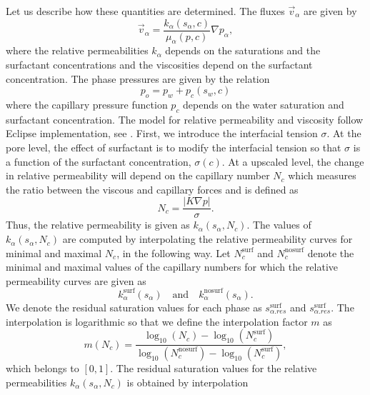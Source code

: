 \documentclass[11pt]{amsart}
\newcommand{\grad}{\nabla}
\newcommand{\abs}[1]{\left| #1\right|}
\newcommand{\surf}{\text{surf}}
\newcommand{\nosurf}{\text{nosurf}}
\begin{document}
Let us describe how these quantities are determined. The fluxes $\vec{v}_\alpha$ are given by
\begin{equation*}
  \vec{v}_\alpha = \frac{k_{\alpha}(s_\alpha, c)}{\mu_{\alpha}(p, c)}\grad p_\alpha,
\end{equation*}
where the relative permeabilities $k_{\alpha}$ depends on the saturations and the surfactant
concentrations and the viscosities depend on the surfactant concentration. The phase pressures are
given by the relation
\begin{equation}
  p_o = p_w + p_c(s_w, c) 
\end{equation}
where the capillary pressure function $p_c$ depends on the water saturation and surfactant
concentration. The model for relative permeability and viscosity follow Eclipse implementation, see
\cite{eclipse, jorgensen}. First, we introduce the interfacial tension $\sigma$. At the pore level,
the effect of surfactant is to modify the interfacial tension so that $\sigma$ is a function of the
surfactant concentration, $\sigma(c)$. At a upscaled level, the change in relative permeability will
depend on the capillary number $N_c$ which measures the ratio between the viscous and capillary
forces and is defined as
\begin{equation}
  \label{eq:defNc}
  N_c = \frac{\abs{K\grad p}}{\sigma}.
\end{equation}
Thus, the relative permeability is given as $k_{\alpha}(s_\alpha, N_c)$. The values of
$k_{\alpha}(s_\alpha, N_c)$ are computed by interpolating the relative permeability curves for
minimal and maximal $N_c$, in the following way. Let $N_c^{\surf}$ and $N_c^{\nosurf}$ denote the
minimal and maximal values of the capillary numbers for which the relative permeability curves are
given as
\begin{equation*}
  k_{\alpha}^{\surf}(s_\alpha)\quad\text{and}\quad k_{\alpha}^{\nosurf}(s_\alpha).
\end{equation*}
We denote the residual saturation values for each phase as $s_{\alpha. res}^{\surf}$ and
$s_{\alpha. res}^{\surf}$. The interpolation is logarithmic so that we define the interpolation factor
$m$ as
\begin{equation} 
  \label{eq:defm}
  m(N_c) = \frac{\log_{10}(N_c) - \log_{10}(N_c^{\surf})}{\log_{10}(N_c^{\nosurf}) - \log_{10}(N_c^{\surf})},
\end{equation}
which belongs to $[0,1]$. The residual saturation values for the relative permeabilities
$k_{\alpha}(s_\alpha, N_c)$ is obtained by interpolation
\end{document}
